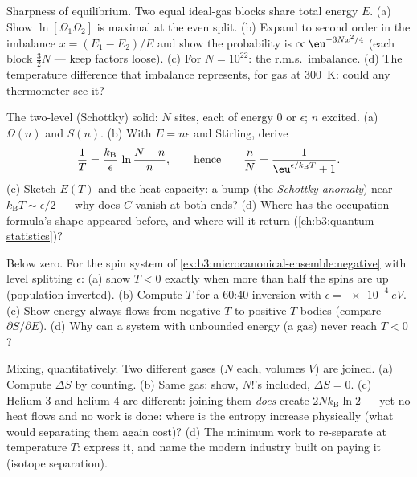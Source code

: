\begin{exercise}[$\star\star$]\label{exo:b3:microcanonical-ensemble:7}
Sharpness of equilibrium. Two equal ideal-gas blocks share total
energy $E$. (a) Show $\ln[\Omega_1\Omega_2]$ is maximal at the
even split. (b) Expand to second order in the imbalance $x =
(E_1 - E_2)/E$ and show the probability is
$\propto\eu^{-3Nx^2/4}$ (each block $\tfrac32 N$  --- keep factors loose). (c) For $N = 10^{22}$: the
r.m.s.\ imbalance. (d) The temperature difference that imbalance
represents, for gas at \qty{300}{K}: could any thermometer see
it?
\end{exercise}

\begin{exercise}[$\star\star$]\label{exo:b3:microcanonical-ensemble:8}
The two-level (Schottky) solid: $N$ sites, each of energy $0$ or
$\epsilon$; $n$ excited. (a) $\Omega(n)$ and $S(n)$. (b) With $E =
n\epsilon$ and Stirling, derive
\[
\frac1T = \frac{k_{\text{B}}}{\epsilon}\,
\ln\frac{N - n}{n} ,
\qquad\text{hence}\qquad
\frac nN = \frac{1}{\eu^{\epsilon/k_{\text{B}}T} + 1} .
\]
(c) Sketch $E(T)$ and the heat capacity: a bump (the
\emph{Schottky anomaly}) near $k_{\text{B}}T \sim \epsilon/2$ ---
why does $C$ vanish at both ends? (d) Where has the occupation
formula's shape appeared before, and where will it return
(\cref{ch:b3:quantum-statistics})?
\end{exercise}

\begin{exercise}[$\star\star$]\label{exo:b3:microcanonical-ensemble:9}
Below zero. For the spin system of
\cref{ex:b3:microcanonical-ensemble:negative} with level splitting
$\epsilon$: (a) show $T < 0$ exactly when more than half the spins
are up (population inverted). (b) Compute $T$ for a 60:40 inversion
with $\epsilon = \qty{e-4}{eV}$. (c) Show energy always flows from
negative-$T$ to positive-$T$ bodies (compare $\partial
S/\partial E$). (d) Why can a system with unbounded energy (a gas)
never reach $T < 0$?
\end{exercise}

\begin{exercise}[$\star\star\star$]\label{exo:b3:microcanonical-ensemble:10}
Mixing, quantitatively. Two different gases ($N$ each, volumes $V$)
are joined. (a) Compute $\Delta S$ by counting. (b) Same gas:
show, $N!$'s included, $\Delta S = 0$. (c) Helium-3 and helium-4
are different: joining them \emph{does} create $2Nk_{\text{B}}\ln2$
--- yet no heat flows and no work is done: where is the entropy
increase physically (what would separating them again cost)? (d)
The minimum work to re-separate at temperature $T$: express it, and
name the modern industry built on paying it (isotope separation).
\end{exercise}

